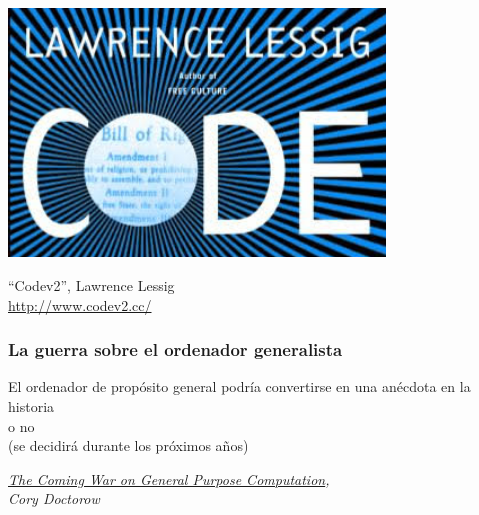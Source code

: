 \documentclass[17pt,aspectratio=169]{beamer}
\begin{document}
\begin{frame}[fragile]

  \begin{center}
  \includegraphics[width=10cm]{figs/code-is-law}
  \end{center}

  \begin{flushright}
``Codev2'', Lawrence Lessig \\
\url{http://www.codev2.cc/}
\end{flushright}

\end{frame}



\begin{frame}
\frametitle{La guerra sobre el ordenador generalista}

\begin{center}
El ordenador de propósito general podría convertirse en una anécdota en la historia \\
o no
\\
(se decidirá durante los próximos años) \\
\end{center}

\begin{flushright}
{\em \href{http://boingboing.net/2011/12/27/the-coming-war-on-general-purp.html}{The Coming War on General Purpose Computation}, \\
  Cory Doctorow} \\
\end{flushright}

\end{frame}
\end{document}
